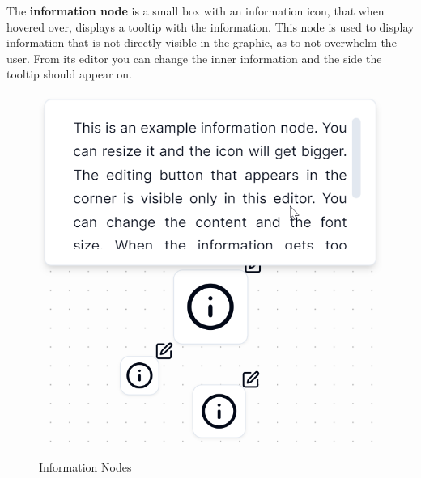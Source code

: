 \noindent The \textbf{information node} is a small box with an information icon, that when hovered over, displays a tooltip with the information. This node is used to display information that is not directly visible in the graphic, as to not overwhelm the user. From its editor you can change the inner information and the side the tooltip should appear on.

\begin{figure}[hbt!]
    \centering
    \begin{minipage}{0.45\textwidth}
        \centering
        \includegraphics[width=1\linewidth]{images/information-node.png}
        \caption{Information Nodes}
        \label{fig:information-node}
    \end{minipage}%
    \hspace{0.1\textwidth}%
    \begin{minipage}{0.45\textwidth}
        \centering

\end{minipage}
\end{figure}
